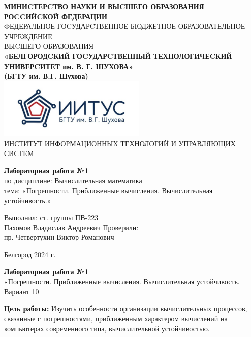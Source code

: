 \documentclass[a4paper,14pt]{extarticle}
\newcommand\textbox[1]{
	\parbox{.45\textwidth}{#1}
}
\begin{document}
\begin{center}
    \small{
        \textbf{МИНИCТЕРCТВО НАУКИ И ВЫCШЕГО ОБРАЗОВАНИЯ РОCCИЙCКОЙ ФЕДЕРАЦИИ}\\
        ФЕДЕРАЛЬНОЕ ГОCУДАРCТВЕННОЕ БЮДЖЕТНОЕ ОБРАЗОВАТЕЛЬНОЕ УЧРЕЖДЕНИЕ\\ВЫCШЕГО ОБРАЗОВАНИЯ \\
        \textbf{«БЕЛГОРОДCКИЙ ГОCУДАРCТВЕННЫЙ ТЕХНОЛОГИЧЕCКИЙ\\УНИВЕРCИТЕТ им. В. Г. ШУХОВА»\\ (БГТУ им. В.Г. Шухова)} \\
        \bigbreak
        \includegraphics[width=70mm]{log}\\
        ИНСТИТУТ ИНФОРМАЦИОННЫХ ТЕХНОЛОГИЙ И УПРАВЛЯЮЩИХ СИСТЕМ\\}
\end{center}

\vfill
\begin{center}
    \large{
        \textbf{
            Лабораторная работа №1}}\\
    \normalsize{
        по дисциплине: Вычислительная математика \\
        тема: «Погрешности. Приближенные вычисления. Вычислительная устойчивость.»}
\end{center}
\vfill
\hfill\textbox{
    Выполнил: ст. группы ПВ-223\\Пахомов Владислав Андреевич
    \bigbreak
    Проверили: \\пр. Четвертухин Виктор Романович
}
\vfill\begin{center}
    Белгород 2024 г.
\end{center}
\newpage
\begin{center}
    \textbf{Лабораторная работа №1}\\
    «Погрешности. Приближенные вычисления. Вычислительная устойчивость.\\
    Вариант 10
\end{center}
\textbf{Цель работы: }Изучить особенности организации вычислительных процессов, связанные с
погрешностями, приближенным характером вычислений на компьютерах современного типа,
вычислительной устойчивостью.
\end{document}
